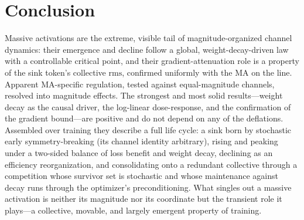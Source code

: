 \documentclass[11pt]{article}
\newcommand{\rms}{\mathrm{rms}}
\begin{document}
\section{Conclusion}
Massive activations are the extreme, visible tail of magnitude-organized channel
dynamics: their emergence and decline follow a global, weight-decay-driven law with
a controllable critical point, and their gradient-attenuation role is a property of
the sink token's collective $\rms$, confirmed uniformly with the MA on the line.
Apparent MA-specific regulation, tested against equal-magnitude channels, resolved
into magnitude effects. The strongest and most solid results---weight decay as the
causal driver, the log-linear dose-response, and the confirmation of the gradient
bound---are positive and do not depend on any of the deflations. Assembled over
training they describe a full life cycle: a sink born by stochastic early
symmetry-breaking (its channel identity arbitrary), rising and peaking under a
two-sided balance of loss benefit and weight decay, declining as an efficiency
reorganization, and consolidating onto a redundant collective through a competition
whose survivor set is stochastic and whose maintenance against decay runs through the
optimizer's preconditioning. What singles out a massive activation is neither its
magnitude nor its coordinate but the transient role it plays---a collective, movable,
and largely emergent property of training.
\end{document}
